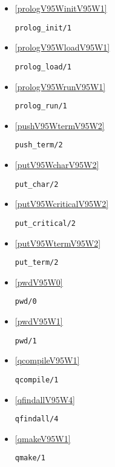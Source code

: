 \begin{itemize}
\item \ref{prologV95WinitV95W1} 
\begin{verbatim}
prolog_init/1
\end{verbatim}

\item \ref{prologV95WloadV95W1} 
\begin{verbatim}
prolog_load/1
\end{verbatim}

\item \ref{prologV95WrunV95W1} 
\begin{verbatim}
prolog_run/1
\end{verbatim}

\item \ref{pushV95WtermV95W2} 
\begin{verbatim}
push_term/2
\end{verbatim}

\item \ref{putV95WcharV95W2} 
\begin{verbatim}
put_char/2
\end{verbatim}

\item \ref{putV95WcriticalV95W2} 
\begin{verbatim}
put_critical/2
\end{verbatim}

\item \ref{putV95WtermV95W2} 
\begin{verbatim}
put_term/2
\end{verbatim}

\item \ref{pwdV95W0} 
\begin{verbatim}
pwd/0
\end{verbatim}

\item \ref{pwdV95W1} 
\begin{verbatim}
pwd/1
\end{verbatim}

\item \ref{qcompileV95W1} 
\begin{verbatim}
qcompile/1
\end{verbatim}

\item \ref{qfindallV95W4} 
\begin{verbatim}
qfindall/4
\end{verbatim}

\item \ref{qmakeV95W1} 
\begin{verbatim}
qmake/1
\end{verbatim}


\end{itemize}
